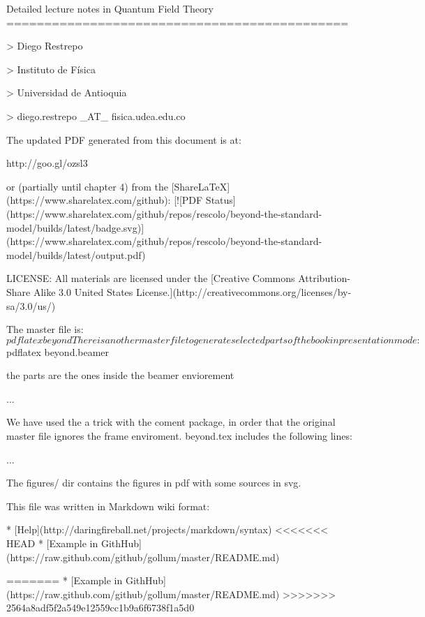 Detailed lecture notes in Quantum Field Theory
=============================================



> Diego Restrepo

> Instituto de Física

> Universidad de Antioquia

> diego.restrepo _AT_ fisica.udea.edu.co

The updated PDF generated from this document is at:

http://goo.gl/ozsl3

or (partially until chapter 4) from the [ShareLaTeX](https://www.sharelatex.com/github): [![PDF Status](https://www.sharelatex.com/github/repos/rescolo/beyond-the-standard-model/builds/latest/badge.svg)](https://www.sharelatex.com/github/repos/rescolo/beyond-the-standard-model/builds/latest/output.pdf)

LICENSE: All materials are licensed under the [Creative Commons Attribution-Share Alike 3.0 United States License.](http://creativecommons.org/licenses/by-sa/3.0/us/)

The master file is:
    $ pdflatex beyond

There is another master file to generate selected parts of the book in
presentation mode:

    $ pdflatex beyond.beamer


the parts are the ones inside the beamer enviorement

    \begin{frame}
    ...
    \end{frame}

We have used the a trick with the coment package, in order that the
original master file ignores the frame enviroment. beyond.tex includes
the following lines:

    \usepackage{comment}
    ...	
    {\begingroup}{\endgroup}

The figures/ dir contains the figures in pdf with some sources in svg.

This file was written in Markdown wiki format: 

* [Help](http://daringfireball.net/projects/markdown/syntax)
<<<<<<< HEAD
* [Example in GithHub](https://raw.github.com/github/gollum/master/README.md)



=======
* [Example in GithHub](https://raw.github.com/github/gollum/master/README.md)
>>>>>>> 2564a8adf5f2a549e12559cc1b9a6f6738f1a5d0
